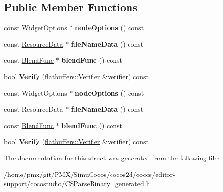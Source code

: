 \subsection*{Public Member Functions}
\begin{DoxyCompactItemize}
\item 
\mbox{\label{structflatbuffers_1_1SpriteOptions_a1df400de3facea20dd9be45f0be1eaf9}} 
const \hyperlink{structflatbuffers_1_1WidgetOptions}{Widget\+Options} $\ast$ {\bfseries node\+Options} () const
\item 
\mbox{\label{structflatbuffers_1_1SpriteOptions_a97fd2b4f14fcaf18acdb0421e1242d7d}} 
const \hyperlink{structflatbuffers_1_1ResourceData}{Resource\+Data} $\ast$ {\bfseries file\+Name\+Data} () const
\item 
\mbox{\label{structflatbuffers_1_1SpriteOptions_a942ca30c27ee06289250cac6e0a64156}} 
const \hyperlink{structBlendFunc}{Blend\+Func} $\ast$ {\bfseries blend\+Func} () const
\item 
\mbox{\label{structflatbuffers_1_1SpriteOptions_a9107af6dcfe1b6a7abf00025a8935ce8}} 
bool {\bfseries Verify} (\hyperlink{classflatbuffers_1_1Verifier}{flatbuffers\+::\+Verifier} \&verifier) const
\item 
\mbox{\label{structflatbuffers_1_1SpriteOptions_a1df400de3facea20dd9be45f0be1eaf9}} 
const \hyperlink{structflatbuffers_1_1WidgetOptions}{Widget\+Options} $\ast$ {\bfseries node\+Options} () const
\item 
\mbox{\label{structflatbuffers_1_1SpriteOptions_a97fd2b4f14fcaf18acdb0421e1242d7d}} 
const \hyperlink{structflatbuffers_1_1ResourceData}{Resource\+Data} $\ast$ {\bfseries file\+Name\+Data} () const
\item 
\mbox{\label{structflatbuffers_1_1SpriteOptions_a942ca30c27ee06289250cac6e0a64156}} 
const \hyperlink{structBlendFunc}{Blend\+Func} $\ast$ {\bfseries blend\+Func} () const
\item 
\mbox{\label{structflatbuffers_1_1SpriteOptions_a9107af6dcfe1b6a7abf00025a8935ce8}} 
bool {\bfseries Verify} (\hyperlink{classflatbuffers_1_1Verifier}{flatbuffers\+::\+Verifier} \&verifier) const
\end{DoxyCompactItemize}


The documentation for this struct was generated from the following file\+:\begin{DoxyCompactItemize}
\item 
/home/pmx/git/\+P\+M\+X/\+Simu\+Cocos/cocos2d/cocos/editor-\/support/cocostudio/C\+S\+Parse\+Binary\+\_\+generated.\+h\end{DoxyCompactItemize}
